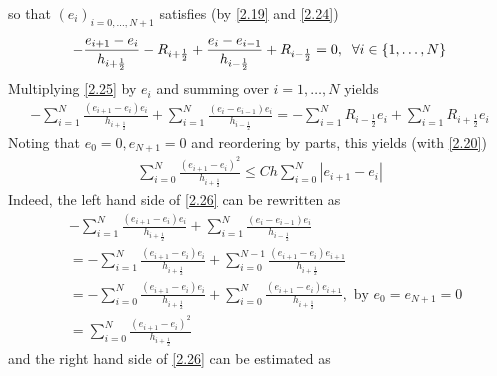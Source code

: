 \documentclass[a4paper]{article}
\numberwithin{equation}{section}
\begin{document}
so that ${\left( {{e_i}} \right)_{i = 0, \ldots ,N + 1}}$ satisfies (by \eqref{2.19} and \eqref{2.24})
\begin{align}
\label{2.25}
 - \frac{{{e_{i + 1}} - {e_i}}}{{{h_{i + \frac{1}{2}}}}} - {R_{i + \frac{1}{2}}} + \frac{{{e_i} - {e_{i - 1}}}}{{{h_{i - \frac{1}{2}}}}} + {R_{i - \frac{1}{2}}} = 0,\hspace{0.2cm}\forall i \in \left\{ {1, \ldots ,N} \right\}
\end{align}
Multiplying \eqref{2.25} by $e_i$ and summing over $i=1,\ldots,N$ yields
\begin{align}
\label{2.26}
 - \sum\limits_{i = 1}^N {\frac{{\left( {{e_{i + 1}} - {e_i}} \right){e_i}}}{{{h_{i + \frac{1}{2}}}}}}  + \sum\limits_{i = 1}^N {\frac{{\left( {{e_i} - {e_{i - 1}}} \right){e_i}}}{{{h_{i - \frac{1}{2}}}}}}  =  - \sum\limits_{i = 1}^N {{R_{i - \frac{1}{2}}}{e_i}}  + \sum\limits_{i = 1}^N {{R_{i + \frac{1}{2}}}{e_i}} 
\end{align}
Noting that $e_0=0,e_{N+1}=0$ and reordering by parts, this yields (with \eqref{2.20})
\begin{align}
\label{2.27}
\sum\limits_{i = 0}^N {\frac{{{{\left( {{e_{i + 1}} - {e_i}} \right)}^2}}}{{{h_{i + \frac{1}{2}}}}}}  \le Ch\sum\limits_{i = 0}^N {\left| {{e_{i + 1}} - {e_i}} \right|} 
\end{align}
Indeed, the left hand side of \eqref{2.26} can be rewritten as
\begin{align}
 &- \sum\limits_{i = 1}^N {\frac{{\left( {{e_{i + 1}} - {e_i}} \right){e_i}}}{{{h_{i + \frac{1}{2}}}}}}  + \sum\limits_{i = 1}^N {\frac{{\left( {{e_i} - {e_{i - 1}}} \right){e_i}}}{{{h_{i - \frac{1}{2}}}}}} \\
 &=  - \sum\limits_{i = 1}^N {\frac{{\left( {{e_{i + 1}} - {e_i}} \right){e_i}}}{{{h_{i + \frac{1}{2}}}}}}  + \sum\limits_{i = 0}^{N - 1} {\frac{{\left( {{e_{i + 1}} - {e_i}} \right){e_{i + 1}}}}{{{h_{i + \frac{1}{2}}}}}} \\
 &=  - \sum\limits_{i = 0}^N {\frac{{\left( {{e_{i + 1}} - {e_i}} \right){e_i}}}{{{h_{i + \frac{1}{2}}}}}}  + \sum\limits_{i = 0}^N {\frac{{\left( {{e_{i + 1}} - {e_i}} \right){e_{i + 1}}}}{{{h_{i + \frac{1}{2}}}}}} ,\mbox{ by } {e_0} = {e_{N + 1}} = 0\\
 &= \sum\limits_{i = 0}^N {\frac{{{{\left( {{e_{i + 1}} - {e_i}} \right)}^2}}}{{{h_{i + \frac{1}{2}}}}}} 
\end{align}
and the right hand side of \eqref{2.26} can be estimated as
\end{document}
